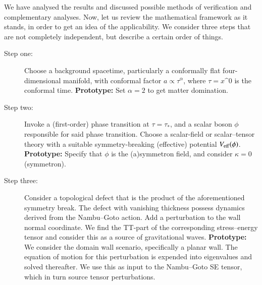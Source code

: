 







We have analysed the results and discussed possible methods of verification and complementary analyses. Now, let us review the mathematical framework as it stands, in order to get an idea of the applicability. 
We consider three steps that are not completely independent, but describe a certain order of things.
\begin{description}
    \item[Step one:] Choose a background spacetime, particularly a conformally flat four-dimensional manifold, with conformal factor $a\propto \tau^\alpha$, where $\tau=x\^0$ is the conformal time. \textbf{Prototype:} Set $\alpha=2$ to get matter domination.
    \item[Step two:] Invoke a (first-order) phase transition at $\tau = \tau_\ast$, and a scalar boson $\phi$ responsible for said phase transition. Choose a scalar-field or scalar--tensor theory with a suitable symmetry-breaking (effective) potential $V_\mathrm{eff}(\phi)$. \textbf{Prototype:} Specify that $\phi$ is the (a)symmetron field, and consider $\kappa=0$ (symmetron).
    \item[Step three:] Consider a topological defect that is the product of the aforementioned symmetry break. The defect with vanishing thickness possess dynamics derived from the Nambu--Goto action. Add a perturbation to the wall normal coordinate. We find the TT-part of the corresponding stress--energy tensor and consider this as a source of gravitational waves. \textbf{Prototype:} We consider the domain wall scenario, specifically a planar wall. The equation of motion for this perturbation is expended into eigenvalues and solved thereafter. We use this as input to the Nambu--Goto SE tensor, which in turn source tensor perturbations.
\end{description}
